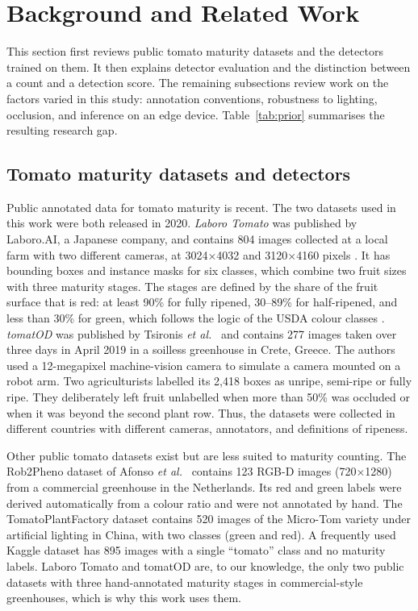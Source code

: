 \section{Background and Related Work}
\label{sec:background}
\label{sec:related}

This section first reviews public tomato maturity datasets and the detectors
trained on them. It then explains detector evaluation and the distinction
between a count and a detection score. The remaining subsections review work on
the factors varied in this study: annotation conventions, robustness to
lighting, occlusion, and inference on an edge device. Table~\ref{tab:prior}
summarises the resulting research gap.

\subsection{Tomato maturity datasets and detectors}
\label{sec:datasets-bg}

Public annotated data for tomato maturity is recent. The two datasets used in
this work were both released in 2020. \emph{Laboro Tomato} was published by
Laboro.AI, a Japanese company, and contains 804 images collected at a local
farm with two different cameras, at 3024$\times$4032 and 3120$\times$4160
pixels \cite{laborotomato2020}. It has bounding boxes and instance masks for
six classes, which combine two fruit sizes with three maturity stages. The
stages are defined by the share of the fruit surface that is red: at least
90\% for fully ripened, 30--89\% for half-ripened, and less than 30\% for green,
which follows the logic of the USDA colour classes \cite{usda1991tomato}.
\emph{tomatOD} was published by Tsironis \emph{et al.}\ \cite{tsironis2020tomatod}
and contains 277 images taken over three days in April 2019 in a soilless
greenhouse in Crete, Greece. The authors used a 12-megapixel machine-vision
camera to simulate a camera mounted on a robot arm. Two agriculturists labelled
its 2,418 boxes as unripe, semi-ripe or fully ripe. They deliberately left fruit
unlabelled when more than 50\% was occluded or when it was beyond the second
plant row. Thus, the datasets were collected in different countries with
different cameras, annotators, and definitions of ripeness.

Other public tomato datasets exist but are less suited to maturity counting.
The Rob2Pheno dataset of Afonso \emph{et al.}\ \cite{afonso2020tomato} contains
123 RGB-D images (720$\times$1280) from a commercial greenhouse in the
Netherlands. Its red and green labels were derived automatically from a colour
ratio and were not annotated by hand. The TomatoPlantFactory dataset
\cite{wu2023plantfactory} contains 520 images of the Micro-Tom variety under
artificial lighting in China, with two classes (green and red). A frequently
used Kaggle dataset \cite{makeml2020tomato} has 895 images with a single
``tomato'' class and no maturity labels. Laboro Tomato and tomatOD are, to our
knowledge, the only two public datasets with three hand-annotated maturity
stages in commercial-style greenhouses, which is why this work uses them.

